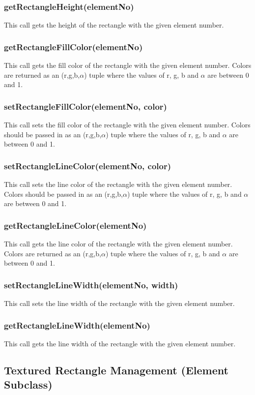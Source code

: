 \documentclass{acm_proc_article-sp}
\begin{document}
\subsubsection{getRectangleHeight(elementNo)}
This call gets the height of the rectangle with the given element number.
\subsubsection{getRectangleFillColor(elementNo)}
This call gets the fill color of the rectangle with the given element number. Colors are returned as an (r,g,b,$\alpha$) tuple where the values of r, g, b and $\alpha$ are between 0 and 1.
\subsubsection{setRectangleFillColor(elementNo, color)}
This call sets the fill color of the rectangle with the given element number. Colors should be passed in as an (r,g,b,$\alpha$) tuple where the values of r, g, b and $\alpha$ are between 0 and 1.
\subsubsection{setRectangleLineColor(elementNo, color)}
This call sets the line color of the rectangle with the given element number. Colors should be passed in as an (r,g,b,$\alpha$) tuple where the values of r, g, b and $\alpha$ are between 0 and 1.
\subsubsection{getRectangleLineColor(elementNo)}
This call gets the line color of the rectangle with the given element number. Colors are returned as an (r,g,b,$\alpha$) tuple where the values of r, g, b and $\alpha$ are between 0 and 1.
\subsubsection{setRectangleLineWidth(elementNo, width)}
This call sets the line width of the rectangle with the given element number.
\subsubsection{getRectangleLineWidth(elementNo)}
This call gets the line width of the rectangle with the given element number.
\subsection{Textured Rectangle Management (Element Subclass)}
\end{document}
